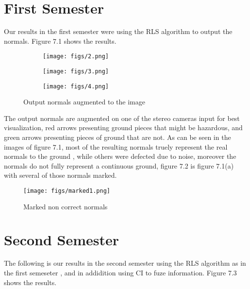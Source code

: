 \documentclass[12pt,a4paper,oneside,onecolumn]{book}
\begin{document}
\section{First Semester}

Our results in the first semester were using the RLS algorithm to output the normals. Figure 7.1 shows the results.  
\begin{figure}[H]
    \centering
    \begin{subfigure}[b]{6cm}
        \texttt{[image: figs/2.png]}
        \caption{}
    \end{subfigure}
    \begin{subfigure}[b]{6cm}
        \texttt{[image: figs/3.png]}
        \caption{}
    \end{subfigure}
    \begin{subfigure}[b]{6cm}
        \texttt{[image: figs/4.png]}
        \caption{}
    \end{subfigure}
    \caption{Output normals augmented to the image}
\end{figure}
The output normals are augmented on one of the stereo cameras input for best visualization, red arrows presenting ground pieces that might be hazardous, and green arrows presenting pieces of ground that are not. As can be seen in the images of figure 7.1, most of the resulting normals truely represent the real normals to the ground , while others were defected due to noise, moreover the normals do not fully represent a continuous ground, figure 7.2 is figure 7.1(a) with several of those normals marked.
\begin{figure}[H]
    \centering
    \texttt{[image: figs/marked1.png]}
    \caption{Marked non correct normals}
\end{figure}


\section{Second Semester}

The following is our results in the second semester using the RLS algorithm as in the first semeseter , and in addidition using CI to fuze information. Figure 7.3 shows the results.  
\end{document}
